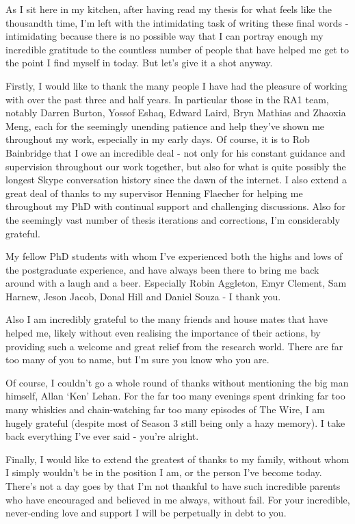 
\begin{acknowledgements}      

\begin{spacing}{1}
As I sit here in my kitchen, after having read my thesis for what feels like
the
thousandth time, I'm left with the intimidating task of writing these final
words - intimidating because there is no possible way that I can portray enough my
incredible gratitude to the countless number of people that have helped me
get to the point I find myself in today. But let's give it a shot anyway.

Firstly, I would like to thank the many people I have had the pleasure of
working with
over the past three and half years. In particular those in
the RA1 team, notably Darren Burton, Yossof Eshaq, Edward
Laird, Bryn Mathias and Zhaoxia Meng, each for the seemingly unending patience
and help
they've shown me throughout my work, especially in my early days. Of course, it
is to Rob Bainbridge that I
owe an incredible deal - not only for his constant guidance and supervision
throughout our work together, but also for what is quite possibly the longest
Skype conversation history since the dawn of the internet.
I also extend a great deal of thanks to my supervisor Henning Flaecher for
helping me throughout my PhD with continual support and challenging discussions.
Also for the seemingly vast number of thesis iterations and corrections, I'm
considerably grateful.

My fellow PhD students with whom I've experienced both the highs and lows of
the postgraduate experience, and have always been there to bring me back around with a
laugh
and a beer. Especially Robin Aggleton, Emyr Clement, Sam Harnew, Jeson Jacob,
Donal Hill
and Daniel Souza - I thank you.

Also I am incredibly grateful to the many friends and house mates that have
helped me, likely without even realising the importance of their actions, by
providing such a welcome and great relief from the research world. There are
far too many of you to name, but I'm sure you know who you are.

Of course, I couldn't go a whole round of thanks without mentioning the big man
himself, Allan `Ken' Lehan. For the far too many evenings spent
drinking far too many whiskies and chain-watching far too many episodes of The
Wire, I am hugely grateful (despite most of Season 3 still being only a hazy
memory). I take back everything I've ever said - you're alright.

Finally, I would like to extend the greatest of thanks to my family, without whom
I simply wouldn't be in the position I am, or the person I've become today.
There's not a day goes by that I'm not thankful to have such incredible parents
who have encouraged and believed in me always, without fail.
For your incredible, never-ending love and support I will be perpetually in debt
to you.
\end{spacing}

\end{acknowledgements}

